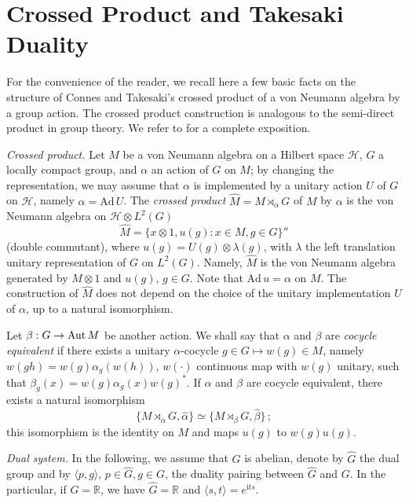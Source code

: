 \documentclass[11pt,a4paper]{article}
\def\be{\begin{equation}}
\def\ee{\end{equation}}
\def\hat{\widehat}
\def\l{\langle}
\def\H{{\mathcal H}}
\def\i{{\mathrm i}}
\def\hat{\widehat}
\def\Ad{{\mathrm {Ad}}}
\def\l{\lambda}
\def\al{\alpha}
\begin{document}
  \appendix
  

  
  
\section{Crossed Product and Takesaki Duality}\label{takesaki}

For the convenience of the reader, we recall here a few basic facts on the structure of Connes and Takesaki's crossed product of a von Neumann algebra by a group action. The crossed product construction is analogous to the semi-direct product in group theory. 
 We refer to \cite{T, vD} for a complete exposition.  
 \smallskip

\noindent
{\it Crossed product.} 
Let $M$ be a von Neumann algebra on a Hilbert space $\H$, $G$ a locally compact group, and $\al$ an action of $G$ on $M$; by changing the representation, we may assume that $\al$ is implemented by a unitary action $U$ of $G$ on $\H$, namely $\al =\Ad\, U$. The {\it crossed product} $\hat M = M\rtimes_\al G$ of $M$ by $\al$ is the von Neumann algebra on $\H\otimes L^2(G)$ 
\be
\hat M = \{x\otimes 1, u(g) : x\in M, g\in G\}''
\ee
(double commutant), where
$u(g) = U(g)\otimes\l(g)$, with $\l$ the left translation unitary representation of $G$ on $L^2(G)$. Namely, $\hat M$ is the von Neumann algebra generated by $M\otimes 1$ and $u(g), \, g\in G$. Note that $\Ad \,u = \al$ on $M$. The construction of $\hat M$ does not depend on the choice of the unitary implementation $U$ of $\al$, up to a natural isomorphism. 

Let $\beta: G\to {\rm Aut}\,M$ be another action. We shall say that $\al$ and $\beta$ are {\it cocycle equivalent} if there exists a unitary $\al$-cocycle $g\in G \mapsto w(g)\in M$, namely $w(gh) = w(g)\al_g(w(h))$, $w(\cdot)$ continuous map with $w(g)$ unitary, such that $\beta_g(x) = w(g)\al_g(x)w(g)^*$.  If $\al$ and $\beta$ are cocycle equivalent, there exists a natural isomorphism
\be
\{M\rtimes_\al G, \hat \al\} \simeq \{M\rtimes_\beta G, \hat \beta\}\, ;
\ee
this isomorphism is the identity on $M$ and maps $u(g)$ to $w(g)u(g)$. 
\smallskip

\noindent
{\it Dual system.} 
In the following, we assume that $G$ is abelian, denote by $\hat G$ the dual group and by $\langle p,g\rangle$, $p\in \hat G, g\in G$, the duality pairing between $\hat G$ and $G$. In the particular, if $G = \mathbb R$, we have $\hat G = \mathbb R$ and $\langle s,t\rangle = e^{\i ts}$. 
\end{document}
